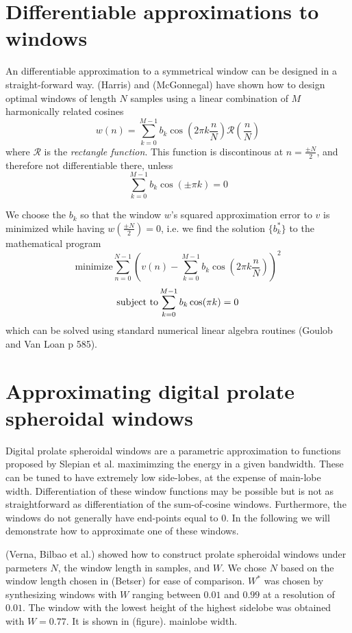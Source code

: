 \documentclass[twoside,a4paper]{article}
\begin{document}
\section{Differentiable approximations to windows}

An differentiable approximation to a symmetrical window can be designed in a
straight-forward way. (Harris) and (McGonnegal) have shown how to design optimal
windows of length $N$ samples using a linear combination of $M$ harmonically
related cosines
\begin{equation}
    w(n) = \sum_{k=0}^{M-1} b_{k} \cos (2 \pi k \frac{n}{N})
\mathcal{R}(\frac{n}{N})
\end{equation}
where $\mathcal{R}$ is the \textit{rectangle function}. This function is discontinous
at $n = \frac{\pm N}{2}$, and therefore not differentiable there, unless
\[
\sum_{k=0}^{M-1} b_{k} \cos ( \pm \pi k ) = 0
\]

We choose the $b_{k}$ so that the window $w$'s squared approximation error to
$v$ is minimized
while having $w(\frac{\pm N}{2}) = 0$, i.e. we find the solution $\{
b^{\ast}_{k} \}$ to the mathematical program
\begin{equation}
    \text{minimize}
    \sum_{n=0}^{N-1} ( v(n) 
        - \sum_{k=0}^{M-1} b_{k} \cos(2 \pi k \frac{n}{N}))^{2}
\end{equation}
\[
    \text{subject to} \\
    \sum_{k=0}^{M-1} b_{k} \cos(\pi k ) = 0
\]
which can be solved using standard numerical linear algebra routines (Goulob and
Van Loan p 585).

\section{Approximating digital prolate spheroidal windows}

Digital prolate spheroidal windows are a parametric approximation to functions
proposed by Slepian et al. maximimzing the energy in a given bandwidth. These can be
tuned to have extremely low side-lobes, at the expense of main-lobe width.
Differentiation of these window functions may be possible but is not as
straightforward as differentiation of the sum-of-cosine windows. Furthermore,
the windows do not generally have end-points equal to 0. In the following we
will demonstrate how to approximate one of these windows.

(Verna, Bilbao et al.) showed how to construct prolate spheroidal windows under
parmeters $N$, the window length in samples, and $W$. We chose $N$ based on the
window length chosen in (Betser) for ease of comparison. $W^{\ast}$ was chosen
by synthesizing windows with $W$ ranging between $0.01$ and $0.99$ at a resolution
of $0.01$. The window with the lowest height of the highest sidelobe was obtained
with $W=0.77$. It is shown in (figure). 
mainlobe width.
\end{document}
